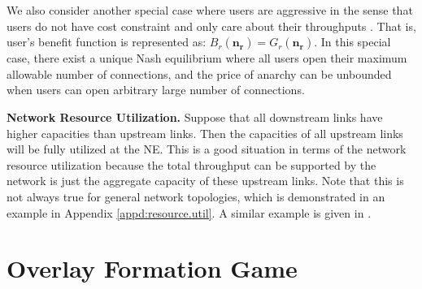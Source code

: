 \documentclass[conference]{IEEEtran}
\begin{document}



We also consider another special case where users are aggressive
in the sense that users do not have cost constraint and only care
about their throughputs \cite{zhang05tcpgame_icnp}. That is,
user's benefit function is represented as: $
B_r(\mathbf{n_r})=G_r(\mathbf{n_r}). $ In this special case, there
exist a unique Nash equilibrium where all users open their maximum
allowable number of connections, and the price of anarchy can be
unbounded when users can open arbitrary large number of
connections.


\bigskip
\noindent \textbf{Network Resource Utilization.} Suppose that all
downstream links have higher capacities than upstream links. Then
the capacities of all upstream links will be fully utilized at the
NE. This is a good situation in terms of the network resource
utilization because the total throughput can be supported by the
network is just the aggregate capacity of these upstream links.
Note that this is not always true for general network topologies,
which is demonstrated in an example in Appendix
\ref{appd:resource.util}. A similar example is given in
\cite{key05fluid}.








\section{Overlay Formation Game
} \label{sec:topo}
\end{document}
